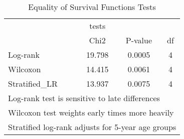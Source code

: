 \begin{table}[htbp]\centering
\caption{Equality of Survival Functions Tests}
\begin{tabular}{l*{3}{c}}
\hline\hline
            &       tests&            &            \\
            &        Chi2&     P-value&          df\\
\hline
Log-rank    &      19.798&      0.0005&           4\\
Wilcoxon    &      14.415&      0.0061&           4\\
Stratified\_LR&      13.937&      0.0075&           4\\
\hline\hline
\multicolumn{4}{l}{\footnotesize Log-rank test is sensitive to late differences}\\
\multicolumn{4}{l}{\footnotesize Wilcoxon test weights early times more heavily}\\
\multicolumn{4}{l}{\footnotesize Stratified log-rank adjusts for 5-year age groups}\\
\end{tabular}
\end{table}
